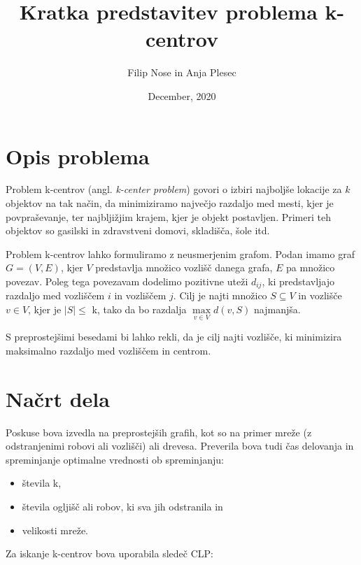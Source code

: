 \documentclass{article}
\begin{document}
\title{Kratka predstavitev problema k-centrov}
\author{Filip Nose in Anja Plesec}
\date{December, 2020}
\maketitle

\newpage


\section{Opis problema}

Problem k-centrov (angl. \textit{k-center problem}) govori o izbiri najboljše lokacije za $k$ objektov na tak način, da minimiziramo največjo razdaljo med mesti, kjer je povpraševanje, ter najbljižjim krajem, kjer je objekt postavljen. Primeri teh objektov so gasilski in zdravstveni domovi, skladišča, šole itd.
\par
Problem k-centrov lahko formuliramo z neusmerjenim grafom. Podan imamo graf $G = (V, E)$, kjer $V$ predstavlja množico vozlišč danega grafa, $E$ pa množico povezav. Poleg tega povezavam dodelimo pozitivne uteži $d_{ij}$, ki predstavljajo razdaljo med vozliščem $i$ in vozliščem $j$. Cilj je najti množico $S \subseteq V$  in vozlišče $v \in V$, kjer je $|S|\leq$ k, tako da bo razdalja $\max\limits_{v \in V} d(v, S)$ najmanjša.
\par
 S preprostejšimi besedami bi lahko rekli, da je cilj najti vozlišče, ki minimizira maksimalno razdaljo med vozliščem in centrom.

\section{Načrt dela}

Poskuse bova izvedla na preprostejših grafih, kot so na primer mreže (z odstranjenimi robovi ali vozlišči) ali drevesa. Preverila bova tudi čas delovanja in spreminjanje optimalne vrednosti ob spreminjanju:
\begin{itemize}
\item{števila k,}
\item{števila ogljišč ali robov, ki sva jih odstranila in}
\item{velikosti mreže.}
\end{itemize}


\vspace{\baselineskip}
\parindent 0mm
Za iskanje k-centrov bova uporabila sledeč CLP:\\
\end{document}
